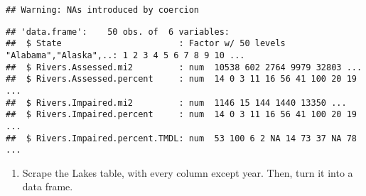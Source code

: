 \documentclass[]{article}
\newenvironment{Shaded}{\begin{snugshade}}{\end{snugshade}}
\newcommand{\CommentTok}[1]{\textcolor[rgb]{0.56,0.35,0.01}{\textit{#1}}}
\newcommand{\KeywordTok}[1]{\textcolor[rgb]{0.13,0.29,0.53}{\textbf{#1}}}
\newcommand{\NormalTok}[1]{#1}
\newcommand{\OperatorTok}[1]{\textcolor[rgb]{0.81,0.36,0.00}{\textbf{#1}}}
\newcommand{\StringTok}[1]{\textcolor[rgb]{0.31,0.60,0.02}{#1}}
\providecommand{\tightlist}{%
  \setlength{\itemsep}{0pt}\setlength{\parskip}{0pt}}
\begin{document}
\begin{Shaded}
\begin{Highlighting}[]
{{{\CommentTok{# 5}
\NormalTok{Rivers}\OperatorTok{$}\NormalTok{Rivers.Assessed.mi2 <-}\StringTok{ }\KeywordTok{as.numeric}\NormalTok{(Rivers}\OperatorTok{$}\NormalTok{Rivers.Assessed.mi2)}
\NormalTok{Rivers}\OperatorTok{$}\NormalTok{Rivers.Assessed.percent <-}\StringTok{ }\KeywordTok{as.numeric}\NormalTok{(Rivers}\OperatorTok{$}\NormalTok{Rivers.Assessed.percent)}
\end{Highlighting}
\end{Shaded}

\begin{verbatim}
## Warning: NAs introduced by coercion
\end{verbatim}

\begin{Shaded}
\end{Shaded}

\begin{verbatim}
## 'data.frame':    50 obs. of  6 variables:
##  $ State                       : Factor w/ 50 levels "Alabama","Alaska",..: 1 2 3 4 5 6 7 8 9 10 ...
##  $ Rivers.Assessed.mi2         : num  10538 602 2764 9979 32803 ...
##  $ Rivers.Assessed.percent     : num  14 0 3 11 16 56 41 100 20 19 ...
##  $ Rivers.Impaired.mi2         : num  1146 15 144 1440 13350 ...
##  $ Rivers.Impaired.percent     : num  14 0 3 11 16 56 41 100 20 19 ...
##  $ Rivers.Impaired.percent.TMDL: num  53 100 6 2 NA 14 73 37 NA 78 ...
\end{verbatim}

\begin{enumerate}
\def\labelenumi{\arabic{enumi}.}
\setcounter{enumi}{5}
\tightlist
\item
  Scrape the Lakes table, with every column except year. Then, turn it
  into a data frame.
\end{enumerate}
\end{document}
